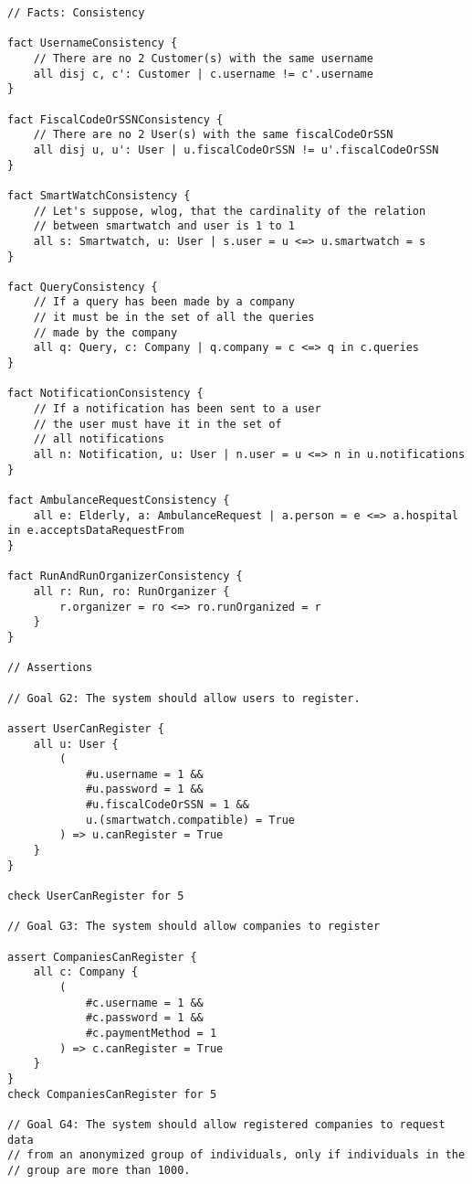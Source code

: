 \begin{verbatim}
// Facts: Consistency

fact UsernameConsistency {
    // There are no 2 Customer(s) with the same username
    all disj c, c': Customer | c.username != c'.username
}

fact FiscalCodeOrSSNConsistency {
    // There are no 2 User(s) with the same fiscalCodeOrSSN
    all disj u, u': User | u.fiscalCodeOrSSN != u'.fiscalCodeOrSSN
}

fact SmartWatchConsistency {
    // Let's suppose, wlog, that the cardinality of the relation
    // between smartwatch and user is 1 to 1
    all s: Smartwatch, u: User | s.user = u <=> u.smartwatch = s
}

fact QueryConsistency {
    // If a query has been made by a company
    // it must be in the set of all the queries 
    // made by the company
    all q: Query, c: Company | q.company = c <=> q in c.queries
}

fact NotificationConsistency {
    // If a notification has been sent to a user
    // the user must have it in the set of 
    // all notifications
    all n: Notification, u: User | n.user = u <=> n in u.notifications
}

fact AmbulanceRequestConsistency {
    all e: Elderly, a: AmbulanceRequest | a.person = e <=> a.hospital in e.acceptsDataRequestFrom
}

fact RunAndRunOrganizerConsistency {
    all r: Run, ro: RunOrganizer {
        r.organizer = ro <=> ro.runOrganized = r
    }
}

// Assertions 

// Goal G2: The system should allow users to register.

assert UserCanRegister {
    all u: User {
        (
            #u.username = 1 && 
            #u.password = 1 && 
            #u.fiscalCodeOrSSN = 1 &&
            u.(smartwatch.compatible) = True
        ) => u.canRegister = True
    }
}

check UserCanRegister for 5

// Goal G3: The system should allow companies to register

assert CompaniesCanRegister {
    all c: Company {
        (
            #c.username = 1 && 
            #c.password = 1 &&  
            #c.paymentMethod = 1 
        ) => c.canRegister = True
    }
}
check CompaniesCanRegister for 5

// Goal G4: The system should allow registered companies to request data
// from an anonymized group of individuals, only if individuals in the
// group are more than 1000.


\end{verbatim}
